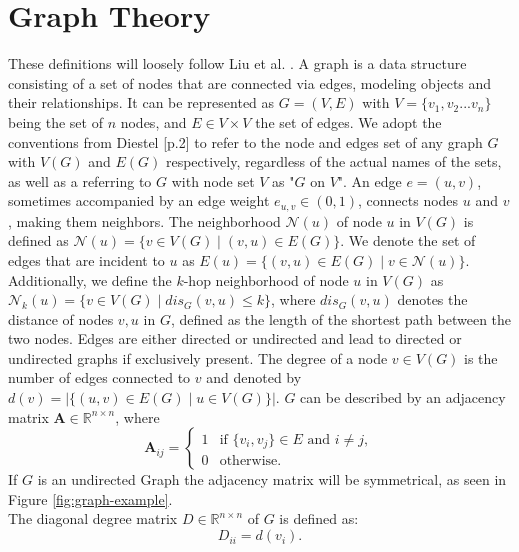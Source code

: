 \section{Graph Theory}
\label{sec:graph_theory}
These definitions will loosely follow Liu et al. \cite{Liu2020}. A graph is a data structure consisting of a set of nodes that are connected via edges, modeling objects and their relationships. It can be represented as $G=(V,E)$ with $V=\{v_1,v_2...v_n\}$ being the set of $n$ nodes, and $E \in V \times V$ the set of edges. We adopt the conventions from Diestel \cite{Diestel2017}[p.2] to refer to the node and edges set of any graph $G$ with $V(G)$ and $E(G)$ respectively, regardless of the actual names of the sets, as well as a referring to $G$ with node set $V$ as "$G$ on $V$". An edge $e=(u,v)$, sometimes accompanied by an edge weight $e_{u,v}\in (0,1)$, connects nodes $u$ and $v$, making them neighbors. The neighborhood $\mathcal{N}(u)$ of node $u$ in $V(G)$ is defined as $\mathcal{N}(u) = \{v \in V(G) \mid (v,u) \in E(G)\}$. We denote the set of edges that are incident to $u$ as $E(u) = \{(v,u) \in E(G) \mid v \in \mathcal{N}(u)\}$. Additionally, we define the $k$-hop neighborhood of node $u$ in $V(G)$ as $\mathcal{N}_k(u) = \{v \in V(G) \mid dis_G(v,u) \leq k\}$, where $dis_G(v,u)$ denotes the distance of nodes $v, u$ in $G$, defined as the length of the shortest path between the two nodes. Edges are either directed or undirected and lead to directed or undirected graphs if exclusively present. The degree of a node $v \in V(G)$ is the number of edges connected to $v$ and denoted by $d(v) = |\{(u,v) \in E(G) \mid u \in V(G)\}|$. $G$ can be described by an adjacency matrix $\mathbf{A} \in \mathbb{R}^{n \times n}$, where
\begin{equation*}
    \mathbf{A}_{ij}=\begin{cases}
        1 & \text{if } \{v_i,v_j\}\in E \text{ and } i \neq j, \\
        0 & \text{otherwise.}
    \end{cases}
\end{equation*}
If $G$ is an undirected Graph the adjacency matrix will be symmetrical, as seen in Figure \ref{fig:graph-example}. \\
The diagonal degree matrix $D\in \mathbb{R}^{n\times n}$ of $G$ is defined as:
\begin{equation*}
    D_{ii} = d(v_i).
\end{equation*}

